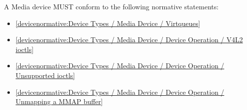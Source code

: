 \label{sec:Conformance / Device Conformance / Media Device Conformance}

A Media device MUST conform to the following normative statements:

\begin{itemize}
\item \ref{devicenormative:Device Types / Media Device / Virtqueues}
\item \ref{devicenormative:Device Types / Media Device / Device Operation / V4L2 ioctls}
\item \ref{devicenormative:Device Types / Media Device / Device Operation / Unsupported ioctls}
\item \ref{devicenormative:Device Types / Media Device / Device Operation / Unmapping a MMAP buffer}
\end{itemize}